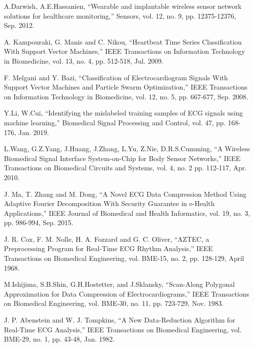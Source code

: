 \documentclass[journal]{IEEEtran}
\begin{document}
\vskip 12pt
{\fontsize{7.8pt}{9.4pt}\selectfont
	\begin{thebibliography}{99} \vskip 7pt
		\setlength{\parskip}{-2pt}
		

		A.Darwish, A.E.Hassanien, ``Wearable and implantable wireless sensor network solutions for healthcare monitoring,'' Sensors, vol. 12, no. 9, pp. 12375-12376, Sep. 2012.

		A. Kampouraki, G. Manis and C. Nikou, ``Heartbeat Time Series Classification With Support Vector Machines,'' IEEE Transactions on Information Technology in Biomedicine, vol. 13, no. 4, pp. 512-518, Jul. 2009.

		F. Melgani and Y. Bazi, ``Classification of Electrocardiogram Signals With Support Vector Machines and Particle Swarm Optimization,'' IEEE Transactions on Information Technology in Biomedicine, vol. 12, no. 5, pp. 667-677, Sep. 2008.

		Y.Li, W.Cui, ``Identifying the mislabeled training samples of ECG signals using machine learning,'' Biomedical Signal Processing and Control, vol. 47, pp. 168-176, Jan. 2019.

		L.Wang, G.Z.Yang, J.Huang, J.Zhang, L.Yu, Z.Nie, D.R.S.Cumming, ``A Wireless Biomedical Signal Interface System-on-Chip for Body Sensor Networks,'' IEEE Transactions on Biomedical Circuits and Systems, vol. 4, no. 2 pp. 112-117, Apr. 2010.

		J. Ma, T. Zhang and M. Dong, ``A Novel ECG Data Compression Method Using Adaptive Fourier Decomposition With Security Guarantee in e-Health Applications,'' IEEE Journal of Biomedical and Health Informatics, vol. 19, no. 3, pp. 986-994, Sep. 2015.

		J. R. Cox, F. M. Nolle, H. A. Fozzard and G. C. Oliver, ``AZTEC, a Preprocessing Program for Real-Time ECG Rhythm Analysis,'' IEEE Transactions on Biomedical Engineering, vol. BME-15, no. 2, pp. 128-129, April 1968.

		M.Ishijima, S.B.Shin, G.H.Hostetter, and J.Sklansky, ``Scan-Along Polygonal Approximation for Data Compression of Electrocardiograms,'' IEEE Transactions on Biomedical Engineering, vol. BME-30, no. 11, pp. 723-729, Nov. 1983.

		J. P. Abenstein and W. J. Tompkins, ``A New Data-Reduction Algorithm for Real-Time ECG Analysis,'' IEEE Transactions on Biomedical Engineering, vol. BME-29, no. 1, pp. 43-48, Jan. 1982.		



\end{thebibliography}}
\end{document}
